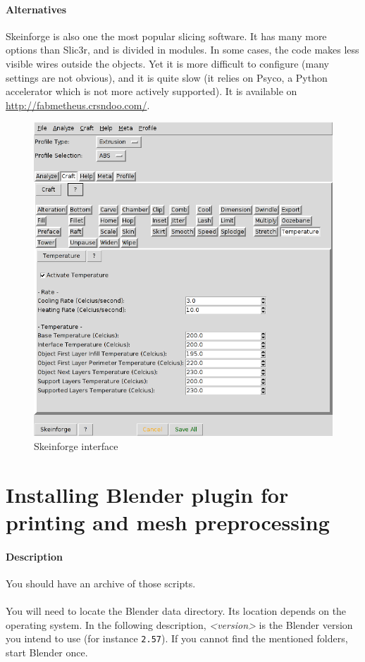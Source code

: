 \documentclass{article}
\begin{document}
	\paragraph{Alternatives} Skeinforge is also one the most popular slicing software. It has many more options than Slic3r, and is divided in modules. In some cases, the code makes less visible wires outside the objects. Yet it is more difficult to configure (many settings are not obvious), and it is quite slow (it relies on Psyco, a Python accelerator which is not more actively supported). It is available on \url{http://fabmetheus.crsndoo.com/}.

	\begin{figure}[h!]
		\centering
		\includegraphics[width=0.6\linewidth]{skeinforge.png}
		\caption{Skeinforge interface}
	\end{figure}

\newpage

\section{Installing Blender plugin for printing and mesh preprocessing}

	\paragraph{Description} You should have an archive of those scripts.

	\paragraph{}
	You will need to locate the Blender data directory. Its location depends on
	the operating system. In the following description, \emph{<version>} is the
	Blender version you intend to use (for instance \texttt{2.57}). If you cannot find the mentioned folders, start Blender once.
\end{document}
